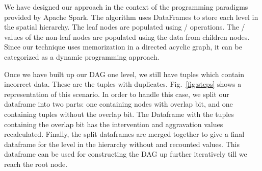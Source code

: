 We have designed our approach in the context of the programming paradigms provided by Apache Spark. 
The algorithm uses DataFrames to store each level in the spatial hierarchy. 
The leaf nodes are populated using {\aggravation}/{\intervention} operations. 
The {\aggravation}/{\intervention} values of the non-leaf nodes are populated using the data from children nodes. 
Since our technique uses memorization in a directed acyclic graph, it can be categorized as a dynamic programming approach.




Once we have built up our DAG one level, we still have tuples which contain incorrect data. These are the tuples with duplicates. Fig.~\ref{fig:steps} shows a representation of this scenario. In order to handle this case, we split our dataframe into two parts: one containing nodes with overlap bit, and one containing tuples without the overlap bit. The Dataframe with the tuples containing the overlap bit has the intervention and aggravation values recalculated. Finally, the split dataframes are merged together to give a final dataframe for the level in the hierarchy without and recounted values. This dataframe can be used for constructing the DAG up further iteratively till we reach the root node.

